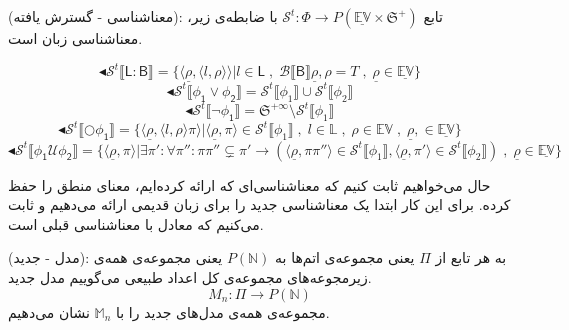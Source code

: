 \begin{defn}
	(معناشناسی - گسترش یافته): تابع 
	$\mathcal{S}^t : \Phi \rightarrow \mathit{P}(\mathbb{\underline{EV}}\times\mathfrak{S}^{+})$
	با ضابطه‌ی زیر، معناشناسی زبان  است.
	
	$$\blacktriangleleft \mathcal{S}^t \llbracket \mathsf{L:B} \rrbracket = 
	\{ \langle \underline{\rho} , \langle l , \rho \rangle\rangle | l \in \mathsf{L} \; , \; \mathcal{B}\llbracket \mathsf{B} \rrbracket \underline{\rho}, \rho=\mathit{T} \; , \; \underline{\rho}\in \mathbb{\underline{EV}}\}$$
	$$\blacktriangleleft \mathcal{S}^t \llbracket \mathsf{\phi_1 \lor \phi_2} \rrbracket =
	\mathcal{S}^t \llbracket \phi_1 \rrbracket \cup \mathcal{S}^t \llbracket \phi_2 \rrbracket
	$$
	$$\blacktriangleleft \mathcal{S}^t \llbracket \mathsf{\neg \phi_1} \rrbracket =
	\mathfrak{S}^{+ \infty} \setminus \mathcal{S}^t \llbracket \phi_1 \rrbracket
	$$
	$$\blacktriangleleft \mathcal{S}^t \llbracket \mathsf{\bigcirc \phi_1} \rrbracket =
	\{ \langle \underline{\rho} , \langle l , \rho \rangle \pi \rangle | \langle \underline{\rho},\pi \rangle \in \mathcal{S}^t \llbracket \phi_1 \rrbracket \; , \; l \in \mathbb{L} \; , \; \rho \in \mathbb{EV} \; , \;\underline{\rho},\in \mathbb{\underline{EV}} \}
	$$
	$$\blacktriangleleft \mathcal{S}^t \llbracket \mathsf{\phi_1 \mathcal{U} \phi_2} \rrbracket =
	\{ \langle \underline{\rho} , \pi \rangle | \exists \pi': \forall \pi'': \pi \pi'' \subsetneq \pi' \rightarrow (\langle \underline{\rho}, \pi \pi'' \rangle \in \mathcal{S}^t \llbracket \phi_1 \rrbracket,\langle \underline{\rho}, \pi' \rangle \in \mathcal{S}^t \llbracket \phi_2 \rrbracket) \; , \;\underline{\rho} \in \mathbb{\underline{EV}} \}
	$$
	
	
\end{defn}

حال می‌خواهیم ثابت کنیم که معناشناسی‌ای که ارائه کرده‌ایم، معنای منطق  را حفظ کرده. 
برای این کار ابتدا یک معناشناسی جدید را برای زبان  قدیمی ارائه می‌دهیم و ثابت می‌کنیم که معادل با معناشناسی قبلی است. 

\begin{defn}
	(مدل - جدید): به هر تابع از $\Pi$ یعنی مجموعه‌ی اتم‌ها به $\mathit{P(\mathbb{N})}$ یعنی مجموعه‌ی همه‌ی زیرمجوعه‌های مجموعه‌ی کل اعداد طبیعی می‌گوییم مدل جدید.
	$$M_n:\Pi \rightarrow \mathit{P(\mathbb{N})}$$
	مجموعه‌ی همه‌ی مدل‌های جدید را با 
	$\mathbb{M}_n$
	نشان می‌دهیم.
\end{defn}

